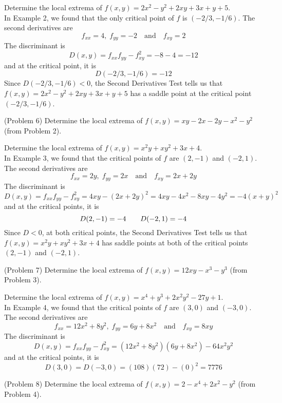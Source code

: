 \documentclass[handout]{ximera}
\begin{document}
\begin{example}[Example 6]
Determine the local extrema of $f(x,y) = 2x^2 - y^2 +2xy + 3x + y+ 5$.\\
In Example 2, we found that the only critical point of $f$ is $(-2/3,-1/6)$.
The second derivatives are
\[
f_{xx} = 4,\; f_{yy} = -2 \quad \text{and} \quad f_{xy} = 2
\]
The discriminant is
\[
D(x,y) = f_{xx} f_{yy} - f_{xy}^2 = -8 -4 = -12
\]
and at the critical point, it is
\[
D(-2/3,-1/6) = -12
\]
Since $D(-2/3,-1/6) < 0$, the Second Derivatives Test tells us that $f(x,y) = 2x^2 - y^2 +2xy + 3x + y+ 5$
has a saddle point at the critical point $(-2/3,-1/6)$.
\end{example}

\begin{problem}(Problem 6)
Determine the local extrema of $f(x,y) = xy - 2x-2y-x^2 - y^2$ (from Problem 2).\\
\end{problem}


\begin{example}[Example 7]
Determine the local extrema of  $f(x,y) = x^2y +xy^2 +3x + 4$.\\
In Example 3, we found that the critical points of $f$ are $(2,-1)$ and $(-2, 1)$.
The second derivatives are
\[
f_{xx} = 2y,\; f_{yy} = 2x \quad \text{and} \quad f_{xy} = 2x + 2y
\]
The discriminant is
\[
D(x,y) = f_{xx} f_{yy} - f_{xy}^2 = 4xy - (2x+2y)^2 = 4xy - 4x^2 - 8xy - 4y^2 = -4(x+y)^2
\]
and at the critical points, it is
\[
D(2, -1) = -4 \quad \text \quad D(-2, 1) = -4
\]
Since $D < 0$, at both critical points, the Second Derivatives Test tells us that $f(x,y) = x^2y +xy^2 +3x + 4$
has saddle points at both of the critical points $(2,-1)$ and $(-2, 1)$.
\end{example}


\begin{problem}(Problem 7)
Determine the local extrema of $f(x,y) = 12xy - x^3 - y^3$ (from Problem 3).\\
\end{problem}



\begin{example}[Example 8]
Determine the local extrema of $f(x,y) = x^4 + y^3 + 2x^2y^2 -27y + 1$.\\
In Example 4, we found that the critical points of $f$ are $(3,0)$ and $(-3,0)$.
The second derivatives are
\[
f_{xx} = 12x^2 + 8y^2,\; f_{yy} = 6y + 8x^2 \quad \text{and} \quad f_{xy} = 8xy
\]
The discriminant is
\[
D(x,y) = f_{xx} f_{yy} - f_{xy}^2 = (12x^2 + 8y^2)(6y + 8x^2) - 64x^2y^2
\]
and at the critical points, it is
\[
D(3, 0) = D(-3,0) = (108)(72) - (0)^2 = 7776
\]
\end{example}

\begin{problem}(Problem 8)
Determine the local extrema of $f(x,y) = 2-x^4 + 2x^2 - y^2$ (from Problem 4).\\
\end{problem}
\end{document}
